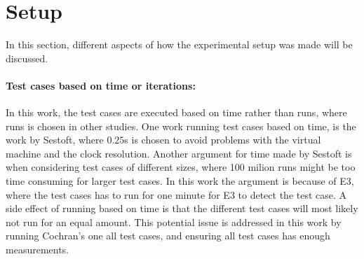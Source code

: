 \section{Setup}

In this section, different aspects of how the experimental setup was made will be discussed.

\paragraph*{Test cases based on time or iterations:} In this work, the test cases are executed based on time rather than runs, where runs is chosen in other studies\cite*[]{Pereira2017,Koedijk2022diff,Georgiou2020}. One work running test cases based on time, is the work by Sestoft\cite*[]{sestoft2013microbenchmarks}, where $0.25$s is chosen to avoid problems with the virtual machine and the clock resolution. Another argument for time made by Sestoft\cite*[]{sestoft2013microbenchmarks} is when considering test cases of different sizes, where 100 milion runs might be too time consuming for larger test cases. In this work the argument is because of E3, where the test cases has to run for one minute for E3 to detect the test case. A side effect of running based on time is that the different test cases will most likely not run for an equal amount. This potential issue is addressed in this work by running Cochran's one all test cases, and ensuring all test cases has enough measurements. 



